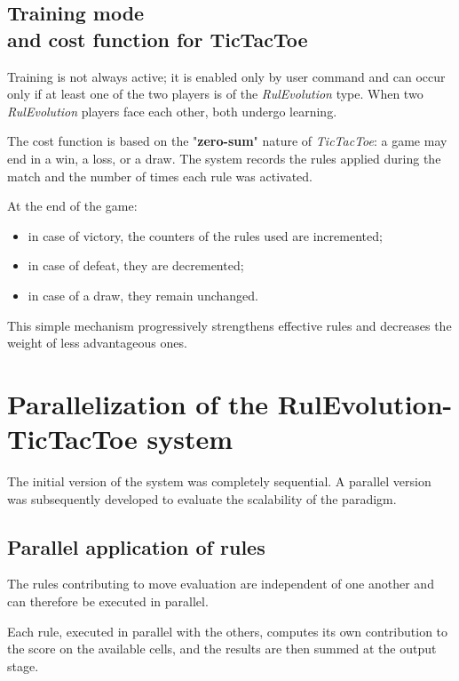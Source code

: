 \documentclass[12pt,a4paper]{article}
\begin{document}
\subsection[Training mode and cost function for TicTacToe]
{Training mode \\ and cost function for TicTacToe}

Training is not always active; it is enabled only by user command and can occur only if at least one of the two players is of the \textit{RulEvolution} type.  
When two \textit{RulEvolution} players face each other, both undergo learning.

The cost function is based on the "\textbf{zero-sum}" nature of \textit{TicTacToe}: a game may end in a win, a loss, or a draw.  
The system records the rules applied during the match and the number of times each rule was activated.

At the end of the game:
\begin{itemize}
    \item in case of victory, the counters of the rules used are incremented;
    \item in case of defeat, they are decremented;
    \item in case of a draw, they remain unchanged.
\end{itemize}

This simple mechanism progressively strengthens effective rules and decreases the weight of less advantageous ones.


\section{Parallelization of the RulEvolution-TicTacToe system}

The initial version of the system was completely sequential.  
A parallel version was subsequently developed to evaluate the scalability of the paradigm.

\subsection{Parallel application of rules}

The rules contributing to move evaluation are independent of one another and can therefore be executed in parallel.  

Each rule, executed in parallel with the others, computes its own contribution to the score on the available cells, and the results are then summed at the output stage.
\end{document}
